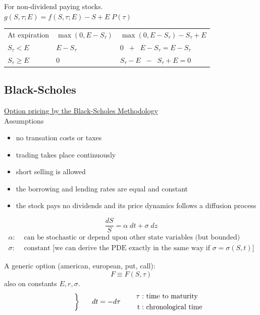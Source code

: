 \documentclass[
14pt,notheorems,hyperref={pdfauthor=whatever}
]{beamer}
\begin{document}
\begin{frame}
For non-dividend paying stocks.\\
$g(S,\tau;E) = f(S,\tau;E)-S+E\;P(\tau)$\\
\hfill\break
\begin{center}
\begin{tabular}{ l l l }
    At expiration & $\max(0,E-S_\tau)$ & $\max(0,E-S_\tau)-S_\tau+E$ \\
    $S_\tau < E$ & $E-S_\tau$ & $0\;\;+\;\;E-S_\tau=E-S_\tau$ \\
    $S_\tau \geq E$ & $0$ & $S_\tau-E\;\;-\;\;S_\tau+E=0$ \\
\end{tabular}
\end{center}
\end{frame}

\subsection{Black-Scholes}
\begin{frame}
\underline{Option pricing by the Black-Scholes Methodology}\\
\hfill\break
Assumptions
\begin{itemize}
    \item no transation costs or taxes
    \item trading takes place continuously
    \item short selling is allowed
    \item the borrowing and lending rates are equal and constant
    \item the stock pays no dividends and its price dynamics follows a diffusion process
\end{itemize}
\[\frac{dS}{S} = \alpha \;dt + \sigma \;dz\]
\begin{align*}
    \alpha:& \text{ can be stochastic or depend upon other state variables (but bounded)}\\
    \sigma:& \text{ constant [we can derive the PDE exactly in the same way if $\sigma = \sigma(S,t)$]}
\end{align*}
\end{frame}

\begin{frame}
A generic option (american, european, put, call):
\[ F \equiv F(S,\tau)\]
\hfill\break
also on constants $E, r, \sigma$.\\
\begin{align*} \tag*{\bigg\} \;\;\;\; $dt = -d\tau \;\;\;\;\;\;\;\;$}
\begin{split}
    \tau:& \text{ time to maturity}
    \\
    \text{t}:& \text{ chronological time}
\end{split}
\end{align*}
\end{frame}
\end{document}
